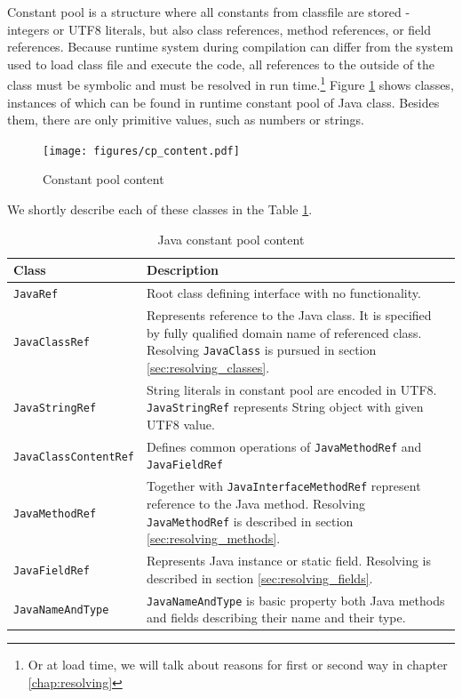 \documentclass[11pt,twoside,a4paper]{book}
\begin{document}
Constant pool is a structure where all constants from classfile are stored - integers or UTF8 literals, but also class references, method references, or field references. 
Because runtime system during compilation can differ from the system used to load class file and execute the code, all references to the outside of the class must be symbolic and must be resolved in run time.\footnote{Or at load time, we will talk about reasons for first or second way in chapter \ref{chap:resolving}} 
Figure \ref{fig:cp_content} shows classes, instances of which can be found in runtime constant pool of Java class.
Besides them, there are only primitive values, such as numbers or strings.

\begin{figure}[ht]
	\begin{center}
		\texttt{[image: figures/cp\_content.pdf]}
	\end{center}
	\caption{Constant pool content}
	\label{fig:cp_content}
\end{figure}

We shortly describe each of these classes in the Table \ref{tab:cp_content}.

\begin{table}[ht]
	\centering
	\begin{tabular}{|l|p{10cm}|}
		\hline
		Class & Description \\
		\hline
		\hline
		\texttt{JavaRef} & Root class defining interface with no functionality. \\
		\hline
		\texttt{JavaClassRef} & Represents reference to the Java class. It is specified
		by fully qualified domain name of referenced class. Resolving \texttt{JavaClass} 
		is pursued in section \ref{sec:resolving_classes}. \\
		\hline
		\texttt{JavaStringRef} & String literals in constant pool are encoded in UTF8.
		\texttt{JavaStringRef} represents String object with given UTF8 value.\\
		\hline
		\texttt{JavaClassContentRef} & Defines common operations of \texttt{JavaMethodRef} and \texttt{JavaFieldRef}\\
		\hline
		\texttt{JavaMethodRef} & Together with \texttt{JavaInterfaceMethodRef} represent reference to the Java method. Resolving \texttt{JavaMethodRef} is described in section \ref{sec:resolving_methods}.\\
		\hline
		\texttt{JavaFieldRef} & Represents Java instance or static field. Resolving is described in section \ref{sec:resolving_fields}.\\
		\hline
		\texttt{JavaNameAndType} & \texttt{JavaNameAndType} is basic property both Java methods and fields describing their name and their type.\\
		\hline
	\end{tabular}
	\caption{Java constant pool content}
	\label{tab:cp_content}
\end{table}
\end{document}
